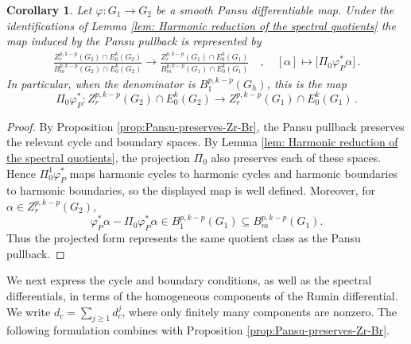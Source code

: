 \documentclass[dvipsnames]{amsart}
\newtheorem{corollary}[theorem]{Corollary}
\theoremstyle{definition}
\theoremstyle{definition}
\numberwithin{equation}{section}
\begin{document}
\begin{corollary}\label{cor: pullback in the subspaces}
    Let $\varphi:G_1 \rightarrow G_2$ be a smooth Pansu differentiable map. Under the identifications of Lemma \ref{lem: Harmonic reduction of the spectral quotients} the map induced by the Pansu pullback is represented by
    \begin{align*}
\frac{Z_r^{p,k-p}(G_2)\cap E_0^k(G_2)}{B_m^{p,k-p}(G_2)\cap  E_0^k(G_2)} \rightarrow \frac{Z_r^{p,k-p}(G_1)\cap  E_0^k(G_1)}{B_m^{p,k-p}(G_1)\cap  E_0^k(G_1)}  \quad ,\quad 
[\alpha] \longmapsto \big[\Pi_0 \varphi_P^* \alpha\big]\,.
\end{align*}
In particular, when the denominator is $B_1^{p,k-p}(G_h)$, this is the map 
\begin{equation*}
    \Pi_0 \varphi_P^* : Z_r^{p,k-p}(G_2) \cap  E_0^k(G_2) \rightarrow Z_r^{p,k-p}(G_1) \cap E_0^k(G_1)\,.
\end{equation*}
\end{corollary}
\begin{proof}
    By Proposition \ref{prop:Pansu-preserves-Zr-Br}, the Pansu pullback preserves the relevant cycle and boundary spaces. By Lemma \ref{lem: Harmonic reduction of the spectral quotients}, the projection $\Pi_0$ also preserves each of these spaces. Hence $\Pi_0^1\varphi_P^*$ maps harmonic cycles to harmonic cycles and harmonic boundaries to harmonic boundaries, so the displayed map is well defined. Moreover, for $\alpha\in Z_r^{p,k-p}(G_2)$,
\[
\varphi_P^*\alpha-\Pi_0\varphi_P^*\alpha
\in B_1^{p,k-p}(G_1)
\subseteq B_m^{p,k-p}(G_1).
\]
Thus the projected form represents the same quotient class as the Pansu pullback.
\end{proof}



We next express the cycle and boundary conditions, as well as the spectral differentials, in terms of the homogeneous components of the Rumin differential. We write $d_c=\sum_{j\geq1}d_c^j$, where only finitely many components are nonzero. The following formulation combines \cite[Propositions 3.4, 3.6 and 3.8]{tripaldi2026spectralcomplexestruncatedmulticomplexes} with Proposition \ref{prop:Pansu-preserves-Zr-Br}.
\end{document}
